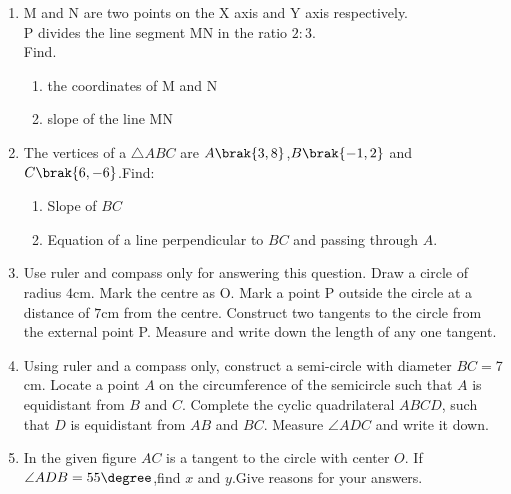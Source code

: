 \begin{enumerate}
\item M and N are two points on the X axis and Y axis respectively.\\
      P  divides the line segment MN in the ratio $2:3$.\\
      Find.
		\begin{enumerate}
		\item the coordinates of M and N
		\item slope of the line MN
		\end{enumerate}

\item The vertices of a $\triangle{ABC}$ are $A\brak{3,8}$,$B\brak{-1,2}$ and $C\brak{6,-6}$.Find:
\begin{enumerate}
    \item Slope of $BC$
    \item Equation of a line perpendicular to $BC$ and passing through $A$.
\end{enumerate}

\item Use ruler and compass only for answering this question. 
Draw a circle of radius $4$$\mathrm{cm}$. Mark the centre as O. Mark a point P outside the circle at a distance of $7$$\mathrm{cm}$ from the centre. Construct two tangents to the circle from the external point P. 
Measure and write down the length of any one tangent.

\item Using ruler and a compass only, construct a semi-circle with diameter $BC = $7$\mathrm{cm}$. 
Locate a point $A$ on the circumference of the semicircle such that $A$ is equidistant from $B$ and $C$. Complete the cyclic quadrilateral $ABCD$, such that $D$ is equidistant from $AB$ and $BC$. Measure $\angle ADC$ and write it down.

\item In the given figure $AC$ is a tangent to the circle with center $O$.
If $\angle{ADB}=55\degree$,find $x$ and $y$.Give reasons for your answers.


\end{enumerate}
